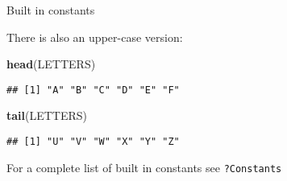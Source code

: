 \documentclass[ignorenonframetext,]{beamer}
\newenvironment{Shaded}{\begin{snugshade}}{\end{snugshade}}
\newcommand{\KeywordTok}[1]{\textcolor[rgb]{0.13,0.29,0.53}{\textbf{#1}}}
\newcommand{\NormalTok}[1]{#1}
\begin{document}
\begin{frame}[fragile]{Built in constants}
\protect\hypertarget{built-in-constants-2}{}

There is also an upper-case version:

\begin{Shaded}
\begin{Highlighting}[]
\KeywordTok{head}\NormalTok{(LETTERS)}
\end{Highlighting}
\end{Shaded}

\begin{verbatim}
## [1] "A" "B" "C" "D" "E" "F"
\end{verbatim}

\begin{Shaded}
\begin{Highlighting}[]
\KeywordTok{tail}\NormalTok{(LETTERS)}
\end{Highlighting}
\end{Shaded}

\begin{verbatim}
## [1] "U" "V" "W" "X" "Y" "Z"
\end{verbatim}

For a complete list of built in constants see \texttt{?Constants}

\end{frame}
\end{document}
